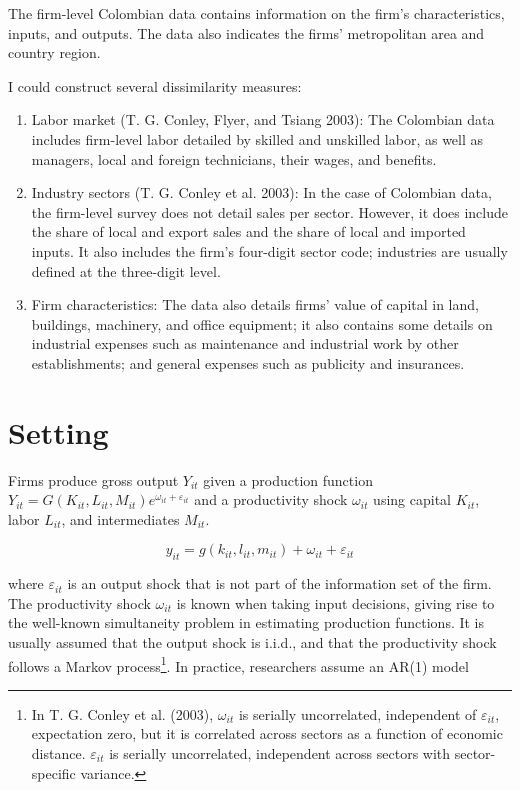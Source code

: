 \documentclass[
]{article}
\providecommand{\tightlist}{%
  \setlength{\itemsep}{0pt}\setlength{\parskip}{0pt}}\usepackage{longtable,booktabs,array}
\begin{document}
The firm-level Colombian data contains information on the firm's
characteristics, inputs, and outputs. The data also indicates the firms'
metropolitan area and country region.

I could construct several dissimilarity measures:

\begin{enumerate}
\def\labelenumi{\arabic{enumi}.}
\tightlist
\item
  Labor market (T. G. Conley, Flyer, and Tsiang 2003): The Colombian
  data includes firm-level labor detailed by skilled and unskilled
  labor, as well as managers, local and foreign technicians, their
  wages, and benefits.
\item
  Industry sectors (T. G. Conley et al. 2003): In the case of Colombian
  data, the firm-level survey does not detail sales per sector. However,
  it does include the share of local and export sales and the share of
  local and imported inputs. It also includes the firm's four-digit
  sector code; industries are usually defined at the three-digit level.
\item
  Firm characteristics: The data also details firms' value of capital in
  land, buildings, machinery, and office equipment; it also contains
  some details on industrial expenses such as maintenance and industrial
  work by other establishments; and general expenses such as publicity
  and insurances.
\end{enumerate}

\hypertarget{setting}{%
\section{Setting}\label{setting}}

Firms produce gross output \(Y_{it}\) given a production function
\(Y_{it}=G(K_{it},L_{it},M_{it})e^{\omega_{it}+\varepsilon_{it}}\) and a
productivity shock \(\omega_{it}\) using capital \(K_{it}\), labor
\(L_{it}\), and intermediates \(M_{it}\).

\[
y_{it}=g(k_{it},l_{it},m_{it})+\omega_{it}+\varepsilon_{it}
\]

where \(\varepsilon_{it}\) is an output shock that is not part of the
information set of the firm. The productivity shock \(\omega_{it}\) is
known when taking input decisions, giving rise to the well-known
simultaneity problem in estimating production functions. It is usually
assumed that the output shock is i.i.d., and that the productivity shock
follows a Markov process\footnote{In T. G. Conley et al. (2003),
  \(\omega_{it}\) is serially uncorrelated, independent of
  \(\varepsilon_{it}\), expectation zero, but it is correlated across
  sectors as a function of economic distance. \(\varepsilon_{it}\) is
  serially uncorrelated, independent across sectors with sector-specific
  variance.}. In practice, researchers assume an AR(1) model
\end{document}
